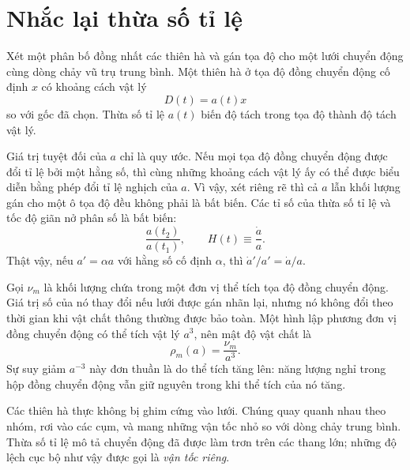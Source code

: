 \section{Nhắc lại thừa số tỉ lệ}

Xét một phân bố đồng nhất các thiên hà và gán tọa độ cho một lưới chuyển động cùng dòng chảy vũ trụ trung bình. Một thiên hà ở tọa độ đồng chuyển động cố định \(x\) có khoảng cách vật lý
\begin{equation}
D(t)=a(t)x
\label{eq:c02-distance}
\end{equation}
so với gốc đã chọn. Thừa số tỉ lệ \(a(t)\) biến độ tách trong tọa độ thành độ tách vật lý.

Giá trị tuyệt đối của \(a\) chỉ là quy ước. Nếu mọi tọa độ đồng chuyển động được đổi tỉ lệ bởi một hằng số, thì cùng những khoảng cách vật lý ấy có thể được biểu diễn bằng phép đổi tỉ lệ nghịch của \(a\). Vì vậy, xét riêng rẽ thì cả \(a\) lẫn khối lượng gán cho một ô tọa độ đều không phải là bất biến. Các tỉ số của thừa số tỉ lệ và tốc độ giãn nở phân số là bất biến:
\begin{equation}
\frac{a(t_2)}{a(t_1)},
\qquad
H(t)\equiv\frac{\dot a}{a}.
\label{eq:c02-hubble}
\end{equation}
Thật vậy, nếu \(a'=\alpha a\) với hằng số cố định \(\alpha\), thì \(\dot a'/a'=\dot a/a\).

Gọi \(\nu_m\) là khối lượng chứa trong một đơn vị thể tích tọa độ đồng chuyển động. Giá trị số của nó thay đổi nếu lưới được gán nhãn lại, nhưng nó không đổi theo thời gian khi vật chất thông thường được bảo toàn. Một hình lập phương đơn vị đồng chuyển động có thể tích vật lý \(a^3\), nên mật độ vật chất là
\begin{equation}
\boxed{\rho_m(a)=\frac{\nu_m}{a^3}.}
\label{eq:c02-matter-density}
\end{equation}
Sự suy giảm \(a^{-3}\) này đơn thuần là do thể tích tăng lên: năng lượng nghỉ trong hộp đồng chuyển động vẫn giữ nguyên trong khi thể tích của nó tăng.

Các thiên hà thực không bị ghim cứng vào lưới. Chúng quay quanh nhau theo nhóm, rơi vào các cụm, và mang những vận tốc nhỏ so với dòng chảy trung bình. Thừa số tỉ lệ mô tả chuyển động đã được làm trơn trên các thang lớn; những độ lệch cục bộ như vậy được gọi là \emph{vận tốc riêng}.

\begin{classroomqa}
\end{classroomqa}

